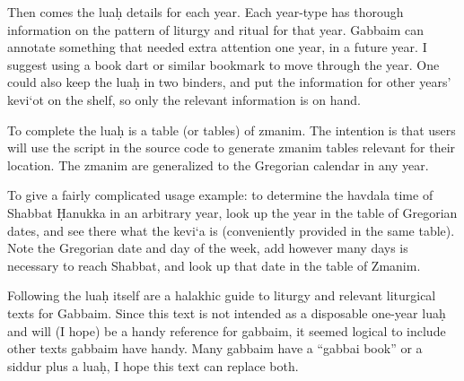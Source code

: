 Then comes the lua\d{h} details for each year. Each year-type has thorough information on the pattern of liturgy and ritual for that year. Gabbaim can annotate something that needed extra attention one year, in a future year. I suggest using a book dart or similar bookmark to move through the year. One could also keep the lua\d{h} in two binders, and put the information for other years' kevi`ot on the shelf, so only the relevant information is on hand.

To complete the lua\d{h} is a table (or tables) of zmanim. The intention is that users will use the script in the source code to generate zmanim tables relevant for their location.  The zmanim are generalized to the Gregorian calendar in any year.

To give a fairly complicated usage example: to determine the havdala time of Shabbat \d{H}anukka in an arbitrary year, look up the year in the table of Gregorian dates, and see there what the kevi`a is (conveniently provided in the same table). Note the Gregorian date and day of the week, add however many days is necessary to reach Shabbat, and look up that date in the table of Zmanim.

Following the lua\d{h} itself are a halakhic guide to liturgy and relevant liturgical texts for Gabbaim. Since this text is not intended as a disposable one-year lua\d{h} and will (I hope) be a handy reference for gabbaim, it seemed logical to include other texts gabbaim have handy. Many gabbaim have a ``gabbai book'' or a siddur plus a lua\d{h}, I hope this text can replace both.